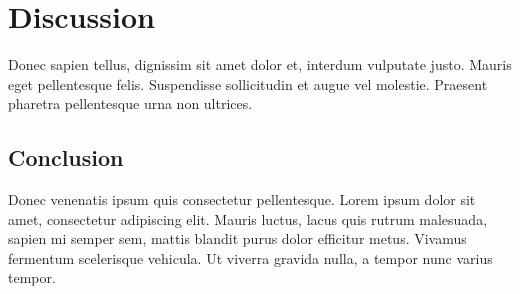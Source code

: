 \section{Discussion}

Donec sapien tellus, dignissim sit amet dolor et, interdum vulputate justo. Mauris eget pellentesque felis. Suspendisse sollicitudin et augue vel molestie. Praesent pharetra pellentesque urna non ultrices.

\subsection{Conclusion}

Donec venenatis ipsum quis consectetur pellentesque. Lorem ipsum dolor sit amet, consectetur adipiscing elit. Mauris luctus, lacus quis rutrum malesuada, sapien mi semper sem, mattis blandit purus dolor efficitur metus. Vivamus fermentum scelerisque vehicula. Ut viverra gravida nulla, a tempor nunc varius tempor.
